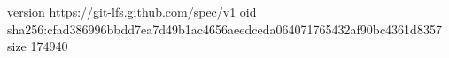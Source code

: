 version https://git-lfs.github.com/spec/v1
oid sha256:cfad386996bbdd7ea7d49b1ac4656aeedceda064071765432af90bc4361d8357
size 174940
